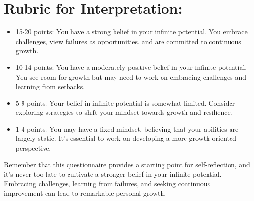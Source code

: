 \documentclass[14pt, letterpaper, twoside]{article}
\begin{document}
\section{Rubric for Interpretation:}	
	\begin{itemize}
		\item 15-20 points: You have a strong belief in your infinite potential. You
		embrace challenges, view failures as opportunities, and are committed to 
		continuous growth.
		\item 10-14 points: You have a moderately positive belief in your infinite
		potential. You see room for growth but may need to work on embracing challenges
		and learning from setbacks.
		\item 5-9 points: Your belief in infinite potential is somewhat limited. Consider
		exploring strategies to shift your mindset towards growth and resilience.
		\item 1-4 points: You may have a fixed mindset, believing that your abilities are
		largely static. It's essential to work on developing a more growth-oriented
		perspective.
		\end{itemize}
		
Remember that this questionnaire provides a starting point for self-reflection, and it's
never too late to cultivate a stronger belief in your infinite potential. Embracing
challenges, learning from failures, and seeking continuous improvement can lead to
remarkable personal growth.
\end{document}
